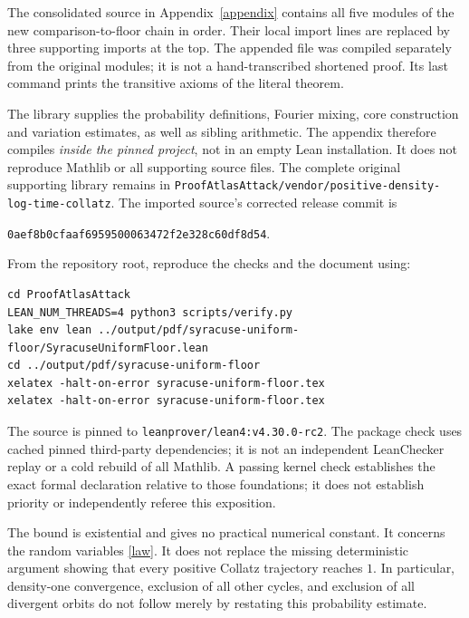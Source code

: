\documentclass[11pt,a4paper]{article}
\theoremstyle{definition}\newtheorem{definition}[theorem]{Definition}
\theoremstyle{remark}\newtheorem{remark}[theorem]{Remark}
\newcommand{\code}[1]{{\small\nolinkurl{#1}}}
\begin{document}
The consolidated source in Appendix~\ref{appendix} contains all five
modules of the new comparison-to-floor chain in order. Their local import
lines are replaced by three supporting imports at the top. The appended
file was compiled separately from the original modules; it is not a
hand-transcribed shortened proof. Its last command prints the transitive
axioms of the literal theorem.

The library supplies the probability definitions, Fourier mixing, core
construction and variation estimates, as well as sibling arithmetic.
The appendix therefore compiles \emph{inside the pinned project}, not in
an empty Lean installation. It does not reproduce Mathlib or all supporting
source files. The complete original supporting library remains in
\code{ProofAtlasAttack/vendor/positive-density-log-time-collatz}.
The imported source's corrected release commit is
\begin{center}\small\texttt{0aef8b0cfaaf6959500063472f2e328c60df8d54}.\end{center}

From the repository root, reproduce the checks and the document using:
\begin{Verbatim}[fontsize=\small,breaklines=true]
cd ProofAtlasAttack
LEAN_NUM_THREADS=4 python3 scripts/verify.py
lake env lean ../output/pdf/syracuse-uniform-floor/SyracuseUniformFloor.lean
cd ../output/pdf/syracuse-uniform-floor
xelatex -halt-on-error syracuse-uniform-floor.tex
xelatex -halt-on-error syracuse-uniform-floor.tex
\end{Verbatim}
The source is pinned to \code{leanprover/lean4:v4.30.0-rc2}. The package
check uses cached pinned third-party dependencies; it is not an independent
LeanChecker replay or a cold rebuild of all Mathlib. A passing kernel check
establishes the exact formal declaration relative to those foundations;
it does not establish priority or independently referee this exposition.

The bound is existential and gives no practical numerical constant.
It concerns the random variables \eqref{law}. It does not replace the
missing deterministic argument showing that every positive Collatz
trajectory reaches $1$. In particular, density-one convergence, exclusion
of all other cycles, and exclusion of all divergent orbits do not follow
merely by restating this probability estimate.
\end{document}
